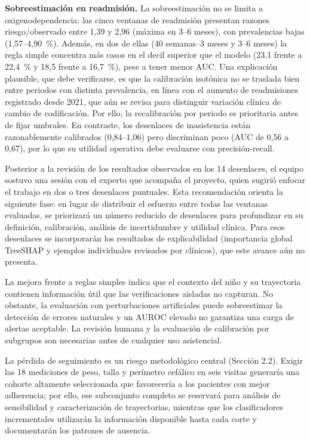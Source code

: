 \documentclass[letterpaper,10pt]{article}
\begin{document}
\textbf{Sobreestimación en readmisión.} La sobreestimación no se limita a oxigenodependencia: las cinco ventanas de readmisión presentan razones riesgo/observado entre 1,39 y 2,96 (máxima en 3--6 meses), con prevalencias bajas (1,57--4,90~\%). Además, en dos de ellas (40 semanas--3 meses y 3--6 meses) la regla simple concentra más casos en el decil superior que el modelo (23,1 frente a 22,4~\% y 18,5 frente a 16,7~\%), pese a tener menor AUC. Una explicación plausible, que debe verificarse, es que la calibración isotónica no se traslada bien entre periodos con distinta prevalencia, en línea con el aumento de readmisiones registrado desde 2021, que aún se revisa para distinguir variación clínica de cambio de codificación. Por ello, la recalibración por periodo es prioritaria antes de fijar umbrales. En contraste, los desenlaces de inasistencia están razonablemente calibrados (0,84--1,06) pero discriminan poco (AUC de 0,56 a 0,67), por lo que su utilidad operativa debe evaluarse con precisión-recall.

Posterior a la revisión de los resultados observados en los 14 desenlaces, el equipo sostuvo una sesión con el experto que acompaña el proyecto, quien sugirió enfocar el trabajo en dos o tres desenlaces puntuales. Esta recomendación orienta la siguiente fase: en lugar de distribuir el esfuerzo entre todas las ventanas evaluadas, se priorizará un número reducido de desenlaces para profundizar en su definición, calibración, análisis de incertidumbre y utilidad clínica. Para esos desenlaces se incorporarán los resultados de explicabilidad (importancia global TreeSHAP y ejemplos individuales revisados por clínicos), que este avance aún no presenta.

La mejora frente a reglas simples indica que el contexto del niño y su trayectoria contienen información útil que las verificaciones aisladas no capturan. No obstante, la evaluación con perturbaciones artificiales puede sobreestimar la detección de errores naturales y un AUROC elevado no garantiza una carga de alertas aceptable. La revisión humana y la evaluación de calibración por subgrupos son necesarias antes de cualquier uso asistencial.

La pérdida de seguimiento es un riesgo metodológico central (Sección 2.2). Exigir las 18 mediciones de peso, talla y perímetro cefálico en seis visitas generaría una cohorte altamente seleccionada que favorecería a los pacientes con mejor adherencia; por ello, ese subconjunto completo se reservará para análisis de sensibilidad y caracterización de trayectorias, mientras que los clasificadores incrementales utilizarán la información disponible hasta cada corte y documentarán los patrones de ausencia.
\end{document}
